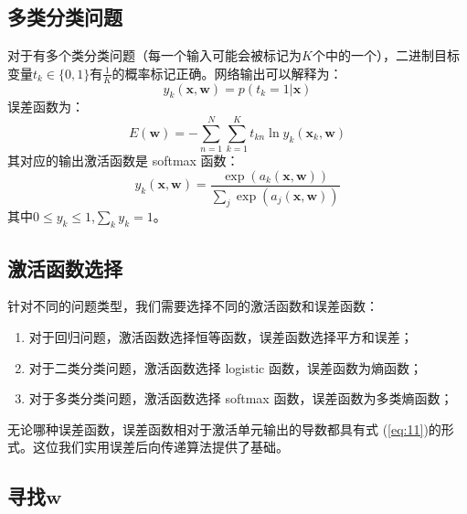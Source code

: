 \documentclass[10pt,a4paper,UTF8]{article}
\begin{document}
\subsection{多类分类问题}
\label{sec:org2c26b1c}

对于有多个类分类问题（每一个输入可能会被标记为\(K\)个中的一个），二进制目标变量\(t_{k}\in \{0,1\}\)有\(\tfrac{1}{K}\)的概率标记正确。网络输出可以解释为：
\begin{equation}
\label{eq:17}
y_{k}(\mathbf{x},\mathbf{w}) = p(t_{k} = 1 | \mathbf{x})
\end{equation}
误差函数为：
\begin{equation}
\label{eq:18}
E(\mathbf{w}) = -\sum_{n=1}^{N}\sum_{k=1}^{K}t_{kn}\ln y_{k}(\mathbf{x}_{k},\mathbf{w})
\end{equation}
其对应的输出激活函数是 softmax 函数：
\begin{equation}
\label{eq:19}
y_{k}(\mathbf{x},\mathbf{w}) = \frac{\exp(a_{k}(\mathbf{x},\mathbf{w}))}{\sum_{j}\exp(a_{j}(\mathbf{x},\mathbf{w}))}
\end{equation}
其中\(0\leq y_{k} \leq 1\),\(\sum_{k} y_{k} = 1\)。
\subsection{激活函数选择}
\label{sec:org6ed0b1d}


针对不同的问题类型，我们需要选择不同的激活函数和误差函数：
\begin{enumerate}
\item 对于回归问题，激活函数选择恒等函数，误差函数选择平方和误差；
\item 对于二类分类问题，激活函数选择 logistic 函数，误差函数为熵函数；
\item 对于多类分类问题，激活函数选择 softmax 函数，误差函数为多类熵函数；
\end{enumerate}

无论哪种误差函数，误差函数相对于激活单元输出的导数都具有式 (\ref{eq:11})的形式。这位我们实用误差后向传递算法提供了基础。
\subsection{寻找\(\mathbf{w}\)}
\label{sec:org014dfca}
\end{document}

